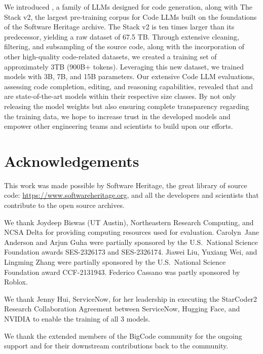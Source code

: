 \documentclass[10pt]{article} %
\begin{document}

We introduced \starcodertwo{}, a family of LLMs designed for code generation, along with The Stack v2, the largest pre-training corpus for Code LLMs built on the foundations of the Software Heritage archive. The Stack v2 is ten times larger than its predecessor, yielding a raw dataset of 67.5 TB. Through extensive cleaning, filtering, and subsampling of the source code, along with the incorporation of other high-quality code-related datasets, we created a training set of approximately 3TB (900B+ tokens). Leveraging this new dataset, we trained \starcodertwo{} models with 3B, 7B, and 15B parameters. Our extensive Code LLM evaluations, assessing code completion, editing, and reasoning capabilities, revealed that  and  are state-of-the-art models within their respective size classes. By not only releasing the model weights but also ensuring complete transparency regarding the training data, we hope to increase trust in the developed models and empower other engineering teams and scientists to build upon our efforts. 


\section{Acknowledgements}

This work was made possible by Software Heritage, the great library of source code: \url{https://www.softwareheritage.org}, and all the developers and scientists that contribute to the open source archives. 

We thank Joydeep Biswas (UT Austin), Northeastern Research Computing, and NCSA Delta for providing computing resources used for evaluation. Carolyn~Jane Anderson and Arjun Guha were partially sponsored by the U.S.~National Science Foundation awards SES-2326173 and SES-2326174. Jiawei Liu, Yuxiang Wei, and Lingming Zhang were partially sponsored by the U.S.~National Science Foundation award CCF-2131943. Federico Cassano was partly sponsored by Roblox. 

We thank Jenny Hui, ServiceNow, for her leadership in executing the StarCoder2 Research Collaboration Agreement between ServiceNow, Hugging Face, and NVIDIA to enable the training of all 3 models.

We thank the extended members of the BigCode community for the ongoing support and for their downstream contributions back to the community. 
\end{document}

